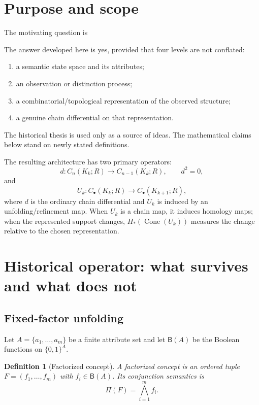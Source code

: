 \documentclass[11pt]{article}
\newtheorem{definition}[theorem]{Definition}
\newcommand{\Cone}{\operatorname{Cone}}
\begin{document}
\section{Purpose and scope}

The motivating question is
\begin{center}
\end{center}
The answer developed here is yes, provided that four levels are not conflated:
\begin{enumerate}[label=(\roman*)]
\item a semantic state space and its attributes;
\item an observation or distinction process;
\item a combinatorial/topological representation of the observed structure;
\item a genuine chain differential on that representation.
\end{enumerate}
The historical thesis is used only as a source of ideas.  The mathematical claims below stand on newly stated definitions.

The resulting architecture has two primary operators:
\[
 d:C_n(K_k;R)\longrightarrow C_{n-1}(K_k;R),\qquad d^2=0,
\]
and
\[
 U_k:C_\bullet(K_k;R)\longrightarrow C_\bullet(K_{k+1};R),
\]
where $d$ is the ordinary chain differential and $U_k$ is induced by an unfolding/refinement map.  When $U_k$ is a chain map, it induces homology maps; when the represented support changes, $H_*(\Cone(U_k))$ measures the change relative to the chosen representation.

\section{Historical operator: what survives and what does not}

\subsection{Fixed-factor unfolding}

Let $A=\{a_1,\dots,a_m\}$ be a finite attribute set and let $\mathsf B(A)$ be the Boolean functions on $\{0,1\}^A$.

\begin{definition}[Factorized concept]
A factorized concept is an ordered tuple $F=(f_1,\dots,f_m)$ with $f_i\in\mathsf B(A)$.  Its conjunction semantics is
\[
\Pi(F)=\bigwedge_{i=1}^m f_i.
\]
\end{definition}
\end{document}
